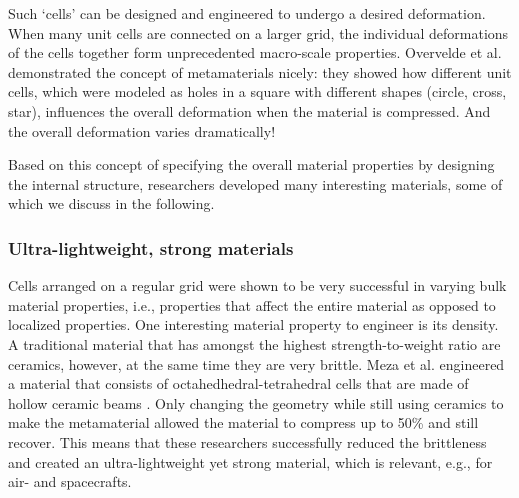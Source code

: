 {%


Such `cells' can be designed and engineered to undergo a desired deformation. When many unit cells are connected on a larger grid, the individual deformations of the cells together form unprecedented macro-scale properties. Overvelde et al. \cite{Overvelde2012a, Overvelde2014} demonstrated the concept of metamaterials nicely: they showed how different unit cells, which were modeled as holes in a square with different shapes (circle, cross, star), influences the overall deformation when the material is compressed. And the overall deformation varies dramatically! 



Based on this concept of specifying the overall material properties by designing the internal structure, researchers developed many interesting materials, some of which we discuss in the following.

\subsubsection{Ultra-lightweight, strong materials} %
Cells arranged on a regular grid were shown to be very successful in varying bulk material properties, i.e., properties that affect the entire material as opposed to localized properties. One interesting material property to engineer is its density. A traditional material that has amongst the highest strength-to-weight ratio are ceramics, however, at the same time they are very brittle. Meza et al. engineered a material that consists of octahedhedral-tetrahedral cells that are made of hollow ceramic beams \cite{Meza2014, Meza2014a, Montemayor2014, Zheng2014}. Only changing the geometry while still using ceramics to make the metamaterial allowed the material to compress up to 50\% and still recover. This means that these researchers successfully reduced the brittleness and created an ultra-lightweight yet strong material, which is relevant, e.g., for air- and spacecrafts. 

}
